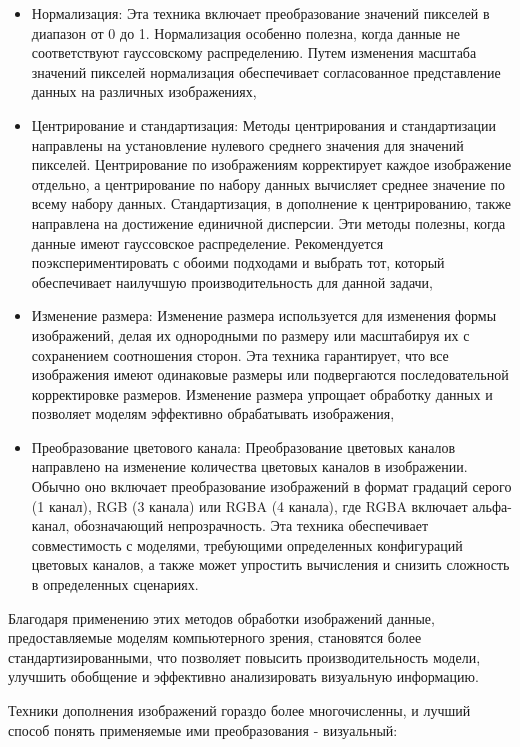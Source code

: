 \begin{itemize}
\item Нормализация: Эта техника включает преобразование значений пикселей в диапазон от 0 до 1. Нормализация особенно полезна, когда данные не соответствуют гауссовскому распределению. Путем изменения масштаба значений пикселей нормализация обеспечивает согласованное представление данных на различных изображениях,
\item Центрирование и стандартизация: Методы центрирования и стандартизации направлены на установление нулевого среднего значения для значений пикселей. Центрирование по изображениям корректирует каждое изображение отдельно, а центрирование по набору данных вычисляет среднее значение по всему набору данных. Стандартизация, в дополнение к центрированию, также направлена на достижение единичной дисперсии. Эти методы полезны, когда данные имеют гауссовское распределение. Рекомендуется поэкспериментировать с обоими подходами и выбрать тот, который обеспечивает наилучшую производительность для данной задачи,
\item Изменение размера: Изменение размера используется для изменения формы изображений, делая их однородными по размеру или масштабируя их с сохранением соотношения сторон. Эта техника гарантирует, что все изображения имеют одинаковые размеры или подвергаются последовательной корректировке размеров. Изменение размера упрощает обработку данных и позволяет моделям эффективно обрабатывать изображения,
\item Преобразование цветового канала: Преобразование цветовых каналов направлено на изменение количества цветовых каналов в изображении. Обычно оно включает преобразование изображений в формат градаций серого (1 канал), RGB (3 канала) или RGBA (4 канала), где RGBA включает альфа-канал, обозначающий непрозрачность. Эта техника обеспечивает совместимость с моделями, требующими определенных конфигураций цветовых каналов, а также может упростить вычисления и снизить сложность в определенных сценариях.
\end{itemize}

Благодаря применению этих методов обработки изображений данные, предоставляемые моделям компьютерного зрения, становятся более стандартизированными, что позволяет повысить производительность модели, улучшить обобщение и эффективно анализировать визуальную информацию.

Техники дополнения изображений гораздо более многочисленны, и лучший способ понять применяемые ими преобразования - визуальный:

